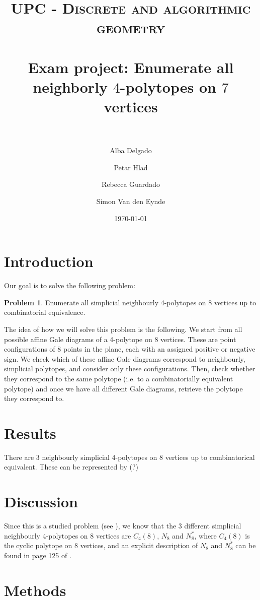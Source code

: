 \documentclass[paper=a4, fontsize=11pt]{scrartcl} %
\title{
\normalfont \normalsize
\textsc{UPC - Discrete and algorithmic geometry} \\ [25pt] %
\horrule{0.5pt} \\[0.4cm] %
\huge Exam project: Enumerate all neighborly $4$-polytopes on $7$ vertices \\ %
\horrule{2pt} \\[0.5cm] %
}
\author{Alba Delgado \and Petar Hlad \and Rebecca Guardado \and Simon Van den Eynde} %
\date{\normalsize\today} %
\theoremstyle{definition}
\newtheorem{prob}{Problem}
\begin{document}
\maketitle %



\section{Introduction}
Our goal is to solve the following problem:
\begin{prob}
Enumerate all simplicial neighbourly 4-polytopes on 8 vertices up to combinatorial equivalence.
\end{prob}
The idea of how we will solve this problem is the following. We start from all possible affine Gale diagrams of a 4-polytope on 8 vertices. These are point configurations of 8 points in the plane, each with an assigned positive or negative sign. We check which of these affine Gale diagrams correspond to neighbourly, simplicial polytopes, and consider only these configurations. Then, check whether they correspond to the same polytope (i.e. to a combinatorially equivalent polytope) and once we have all different Gale diagrams, retrieve the polytope they correspond to.
\section{Results}
There are 3 neighbourly simplicial 4-polytopes on 8 vertices up to combinatorical equivalent. These can be represented by (?)
\section{Discussion}
Since this is a studied problem (see \cite{GrSr67}), we know that the 3 different simplicial neighbourly 4-polytopes on 8 vertices are $C_4(8)$, $N_8$ and $N_8^*$, where $C_4(8)$ is the cyclic polytope on 8 vertices, and an explicit description of $N_8$ and $N_8^*$ can be found in page 125 of \cite{Gr03}.
\section{Methods}
\end{document}
